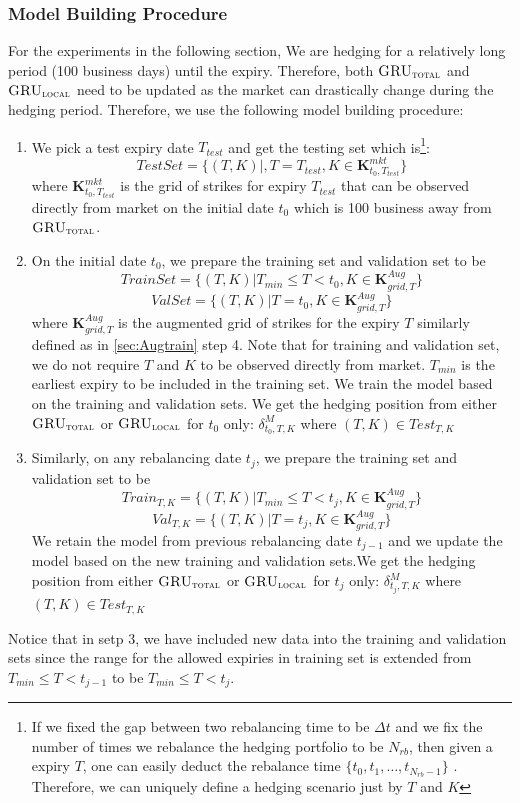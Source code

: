 \documentclass[letterpaper,12pt,titlepage,oneside,final]{book}
\numberwithin{equation}{section}
\theoremstyle{definition}
\newcommand{\modelT}{\textsc{GRU}_{\textsc{total}}}
\newcommand{\modelL}{\textsc{GRU}_{\textsc{local}}}
\newcommand{\DT}{\Delta t}
\begin{document}
\subsubsection{Model Building Procedure}
For the experiments in the following section, We are hedging for a relatively long period (100 business days) until the expiry. Therefore, both $\modelT$ and $\modelL$ need to be updated as the market can drastically change during the hedging period. Therefore, we use the following model building procedure:
\begin{enumerate}
	\item We pick a  test expiry date $T_{test}$ and get the testing set  which is\footnote{ If we fixed the gap between two rebalancing time to be $\DT$ and we fix the number of times we rebalance the hedging portfolio to be $N_{rb}$, then given a expiry $T$, one can easily deduct the rebalance time $\{t_0,t_1, \dots, t_{N_{rb}-1}\}$ . Therefore, we can uniquely define a hedging scenario just by $T$ and $K$}:
	\[
	TestSet=\{(T,K)|,T=T_{test},K \in \mathbf{K}^{mkt}_{t_0,T_{test}}\}
	\] where $\mathbf{K}^{mkt}_{t_0,T_{test}}$ is the grid of  strikes for expiry $T_{test}$ that can be observed directly from market on the initial date $t_0$ which is 100 business away from $\modelT$.
	\item On the initial date $t_0$, we prepare the training set  and validation set to be 
		\[TrainSet=\{(T,K)|T_{min} \leq T<t_0, K \in \mathbf{K}^{Aug}_{grid,T}\}\]
			\[ValSet=\{(T,K)|T=t_0, K \in \mathbf{K}^{Aug}_{grid,T}\}\]
		where $\mathbf{K}^{Aug}_{grid,T}$ is the augmented grid of strikes for the expiry $T$ similarly defined as  in \ref{sec:Augtrain} step 4. Note that for training and validation set, we do not require $T$ and $K$ to be observed directly from market. $T_{min}$ is the earliest expiry to be included in the training set. We train the model based on the training and validation sets. We get the hedging position from either $\modelT$ or $\modelL$ for $t_0$ only: $\delta^{M}_{t_0,T,K}$ where $(T,K) \in Test_{T,K}$
		
	\item Similarly, on any rebalancing date $t_j$, we prepare the training set  and validation set to be 
	\[Train_{T,K}=\{(T,K)|T_{min} \leq T<t_j, K \in \mathbf{K}^{Aug}_{grid,T}\}\]
	\[Val_{T,K}=\{(T,K)|T=t_j, K \in \mathbf{K}^{Aug}_{grid,T}\}\]
 We retain the model from previous rebalancing date $t_{j-1}$ and we update the model based on the new training and validation sets.We get the hedging position from either $\modelT$ or $\modelL$ for $t_j$ only: $\delta^{M}_{t_j,T,K}$ where $(T,K) \in Test_{T,K}$
\end{enumerate}
Notice that in setp 3, we have included new data into the training and validation sets since the range for the allowed expiries in training set is extended from $T_{min} \leq T<t_{j-1}$ to be $T_{min} \leq T<t_{j}$.
\end{document}
